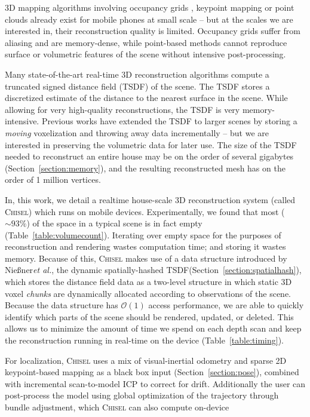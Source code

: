 \documentclass[conference]{IEEEtran}
\newcommand{\sref}[1]{Section~\ref{#1}}
\newcommand{\tabref}[1]{Table~\ref{#1}}
\newcommand{\etal}{\textit{et al.}\xspace}
\newcommand{\TSDF}{TSDF\xspace}
\newcommand{\Niessner}{Nie{\ss}ner\xspace}
\newcommand{\chisel}{\textsc{Chisel}\xspace}
\begin{document}
3D mapping algorithms involving occupancy grids \cite{Elfes1989}, keypoint
mapping \cite{KleinSparse} or point clouds \cite{RusinkiewiczPoints,
TanskanenMetric, WeiseScanning} already exist for mobile phones at small scale
-- but at the scales we are interested in, their reconstruction quality is
limited. Occupancy grids suffer from aliasing and are memory-dense, while
point-based methods cannot reproduce surface or volumetric features of the scene
without intensive post-processing.

Many state-of-the-art real-time 3D reconstruction algorithms \cite{Newcombe,
Whelan2013,WhelanLoopClose,Bylow2013,NiessnerHashing} compute a truncated
signed distance field (\TSDF) \cite{Curless1996} of the scene. The \TSDF stores a
discretized estimate of the distance to the nearest surface in the scene. While
allowing for very high-quality reconstructions, the \TSDF is very
memory-intensive. Previous works \cite{Whelan2013, WhelanLoopClose} have
extended the \TSDF to larger scenes by storing a \textit{moving} voxelization
and throwing away data incrementally -- but we are interested in preserving the
volumetric data for later use. The size of the \TSDF needed to reconstruct an
entire house may be on the order of several gigabytes  (\sref{section:memory}), and the
resulting reconstructed mesh has on the order of 1 million vertices.  

In, this work, we detail a realtime house-scale 3D reconstruction system
(called \chisel) which runs on mobile devices. Experimentally, we found that
most ( $\sim 93\%$) of the space in a typical scene is in fact empty
(\tabref{table:volumecount}). Iterating over empty space for the purposes of
reconstruction and rendering wastes computation time; and storing it wastes
memory. Because of this, \chisel makes use of a data structure introduced by
\Niessner \etal \cite{NiessnerHashing}, the dynamic spatially-hashed
\cite{SpatialHashing} \TSDF (\sref{section:spatialhash}), which stores the
distance field data as a two-level structure in which static 3D voxel
\textit{chunks} are dynamically allocated according to observations of the
scene. Because the data structure has $\mathcal{O}(1)$ access performance, we
are able to quickly identify which parts of the scene should be rendered, 
updated, or deleted. This allows us to minimize the amount of time we spend on
each depth scan and keep the reconstruction running in real-time on the device
(\tabref{table:timing}).

For localization, \chisel uses a mix of  visual-inertial odometry \cite{VINS,
VINS2} and sparse 2D keypoint-based mapping \cite{FastSlam} as a black box input
(\sref{section:pose}), combined with incremental scan-to-model ICP
\cite{BeslICP} to correct for drift. Additionally the user can
post-process the model using global optimization of the trajectory through
bundle adjustment, which \chisel can also compute on-device
\end{document}
